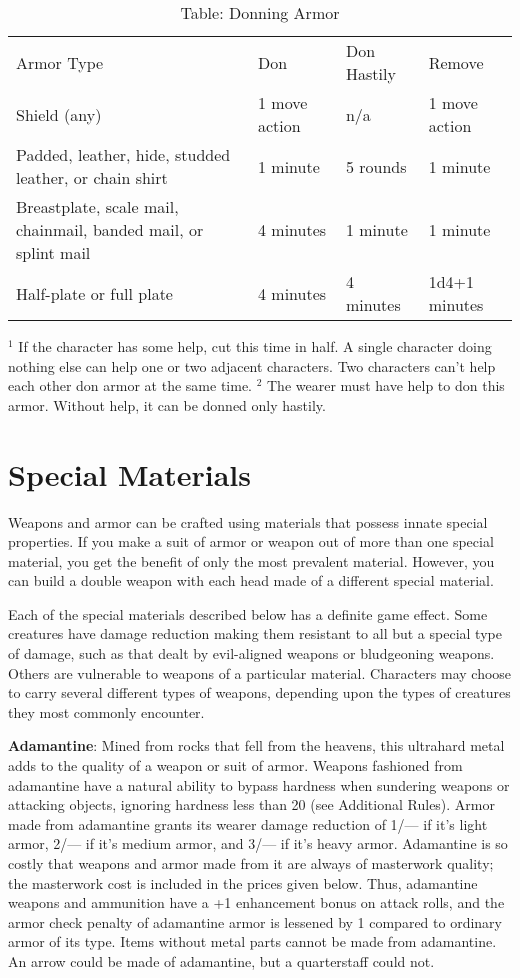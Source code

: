 \begin{table}[]
\caption{Table: Donning Armor}
\begin{tabular}{llll}
Armor Type & Don & Don Hastily & Remove\\
Shield (any) & 1 move action &  n/a & 1 move action \\
Padded, leather, hide, studded leather, or chain shirt & 1 minute & 5 rounds & 1 minute \\
Breastplate, scale mail, chainmail, banded mail, or splint mail & 4 minutes & 1 minute & 1 minute \\
Half-plate or full plate & 4 minutes & 4 minutes & 1d4+1 minutes\\
\end{tabular}
\(^{1}\) If the character has some help, cut this time in half. A single character doing nothing else can help one or two adjacent characters. Two characters can't help each other don armor at the same time.
\(^{2}\) The wearer must have help to don this armor. Without help, it can be donned only hastily.
\end{table}

\section{Special Materials}
	
Weapons and armor can be crafted using materials that possess innate special properties. If you make a suit of armor or weapon out of more than one special material, you get the benefit of only the most prevalent material. However, you can build a double weapon with each head made of a different special material. 
	
Each of the special materials described below has a definite game effect. Some creatures have damage reduction making them resistant to all but a special type of damage, such as that dealt by evil-aligned weapons or bludgeoning weapons. Others are vulnerable to weapons of a particular material. Characters may choose to carry several different types of weapons, depending upon the types of creatures they most commonly encounter. 
	
\textbf{Adamantine}: Mined from rocks that fell from the heavens, this ultrahard metal adds to the quality of a weapon or suit of armor. Weapons fashioned from adamantine have a natural ability to bypass hardness when sundering weapons or attacking objects, ignoring hardness less than 20 (see Additional Rules). Armor made from adamantine grants its wearer damage reduction of 1/--- if it's light armor, 2/--- if it's medium armor, and 3/--- if it's heavy armor. Adamantine is so costly that weapons and armor made from it are always of masterwork quality; the masterwork cost is included in the prices given below. Thus, adamantine weapons and ammunition have a +1 enhancement bonus on attack rolls, and the armor check penalty of adamantine armor is lessened by 1 compared to ordinary armor of its type. Items without metal parts cannot be made from adamantine. An arrow could be made of adamantine, but a quarterstaff could not.
	
